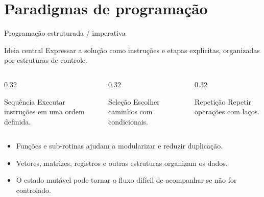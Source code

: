 \documentclass[aspectratio=169,10pt]{beamer}
\begin{document}
\section{Paradigmas de programação}

\begin{frame}{Programação estruturada / imperativa}
  \begin{block}{Ideia central}
    Expressar a solução como instruções e etapas explícitas, organizadas por estruturas de controle.
  \end{block}
  \begin{columns}[T,onlytextwidth]
    \begin{column}{0.32\textwidth}
      \begin{exampleblock}{Sequência}
        Executar instruções em uma ordem definida.
      \end{exampleblock}
    \end{column}
    \begin{column}{0.32\textwidth}
      \begin{exampleblock}{Seleção}
        Escolher caminhos com condicionais.
      \end{exampleblock}
    \end{column}
    \begin{column}{0.32\textwidth}
      \begin{exampleblock}{Repetição}
        Repetir operações com laços.
      \end{exampleblock}
    \end{column}
  \end{columns}
  \begin{itemize}
    \item Funções e sub-rotinas ajudam a modularizar e reduzir duplicação.
    \item Vetores, matrizes, registros e outras estruturas organizam os dados.
    \item O estado mutável pode tornar o fluxo difícil de acompanhar se não for controlado.
  \end{itemize}
\end{frame}
\end{document}
